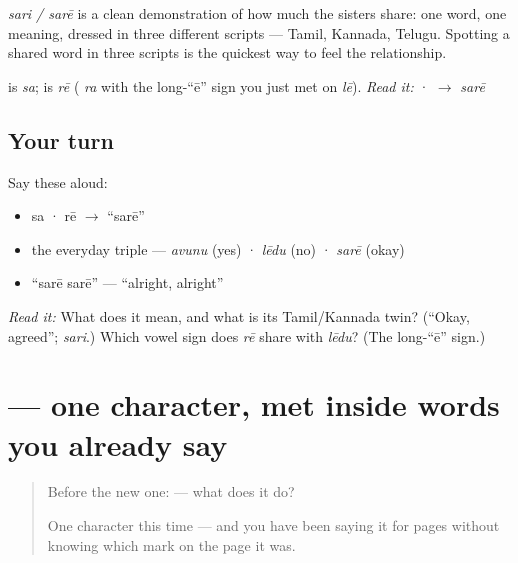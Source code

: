 \begin{grammarlens}[title={Grammar Lens: one shared word, three scripts}]
\emph{sari / sarē} is a clean demonstration of how much the sisters share: one word, one meaning, dressed in three different scripts — Tamil, Kannada, Telugu. Spotting a shared word in three scripts is the quickest way to feel the relationship.
\end{grammarlens}

\begin{sounds}
 is \emph{sa};  is \emph{rē} ( \emph{ra} with the long-“ē” sign you just met on \emph{lē}). \emph{Read it:} · $\to$ \emph{sarē}
\end{sounds}

\subsection*{Your turn}
Say these aloud:

\begin{itemize}
\raggedright
  \item sa · rē $\to$ \textquotedblleft{}sarē\textquotedblright{}
  \item the everyday triple — \emph{avunu} (yes) · \emph{lēdu} (no) · \emph{sarē} (okay)
  \item \textquotedblleft{}sarē sarē\textquotedblright{} — \textquotedblleft{}alright, alright\textquotedblright{}
\end{itemize}

\begin{tcolorbox}[breakable,colback=teal!4,colframe=teal!35!black,title={Before you move on}]
\emph{Read it:} \textbf{} What does it mean, and what is its Tamil/Kannada twin? (\textquotedblleft{}Okay, agreed\textquotedblright{}; \emph{sari}.) Which vowel sign does \emph{rē} share with \emph{lēdu}? (The long-\textquotedblleft{}ē\textquotedblright{} sign.)
\end{tcolorbox}
\section[\texorpdfstring{\te{ే} (ē)}{ే (ē)}]{ — one character, met inside words you already say}

\label{lesson:TE-S120-vowel-sign-ee}



\begin{quote}
Before the new one:  — what does it do?

One character this time — and you have been saying it for pages without knowing which mark on the page it was.
\end{quote}

